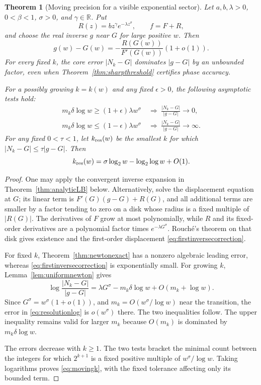 \documentclass[11pt,a4paper]{article}
\newtheorem{theorem}{Theorem}[section]
\theoremstyle{definition}
\theoremstyle{remark}
\newcommand{\R}{\mathbb R}
\numberwithin{equation}{section}
\begin{document}
\begin{theorem}[Moving precision for a visible exponential sector]\label{thm:resolution}
Let $a,b,\lambda>0$, $0<\beta<1$, $\sigma>0$, and $\gamma\in\R$. Put
\[
 R(z)=b z^\gamma e^{-\lambda z^\sigma},\qquad f=F+R,
\]
and choose the real inverse $g$ near $G$ for large positive $w$. Then
\begin{equation}\label{eq:firstinversecorrection}
 g(w)-G(w)=-\frac{R(G(w))}{F'(G(w))}(1+o(1)).
\end{equation}
For every fixed $k$, the core error $|N_k-G|$ dominates $|g-G|$ by an unbounded factor, even when Theorem~\ref{thm:sharpthreshold} certifies phase accuracy.

For a possibly growing $k=k(w)$ and any fixed $\epsilon>0$, the following asymptotic tests hold:
\begin{align}
 m_k\delta\log w\ge(1+\epsilon)\lambda w^\sigma
 &\ \Longrightarrow\ \frac{|N_k-G|}{|g-G|}\longrightarrow0,\label{eq:resolutionupper}\\
 m_k\delta\log w\le(1-\epsilon)\lambda w^\sigma
 &\ \Longrightarrow\ \frac{|N_k-G|}{|g-G|}\longrightarrow\infty.
 \label{eq:resolutionlower}
\end{align}
For any fixed $0<\tau<1$, let $k_{\rm res}(w)$ be the smallest $k$ for which $|N_k-G|\le\tau|g-G|$. Then
\begin{equation}\label{eq:movingk}
 k_{\rm res}(w)=\sigma\log_2w-\log_2\log w+O(1).
\end{equation}
\end{theorem}
\begin{proof}
One may apply the convergent inverse expansion in Theorem~\ref{thm:analyticLB} below. Alternatively, solve the displacement equation at $G$; its linear term is $F'(G)(g-G)+R(G)$, and all additional terms are smaller by a factor tending to zero on a disk whose radius is a fixed multiple of $|R(G)|$. The derivatives of $F$ grow at most polynomially, while $R$ and its fixed-order derivatives are a polynomial factor times $e^{-\lambda G^\sigma}$. Rouch\'e's theorem on that disk gives existence and the first-order displacement \eqref{eq:firstinversecorrection}.

For fixed $k$, Theorem~\ref{thm:newtonexact} has a nonzero algebraic leading error, whereas \eqref{eq:firstinversecorrection} is exponentially small. For growing $k$, Lemma~\ref{lem:uniformnewton} gives
\begin{equation}\label{eq:resolutionlog}
 \log\frac{|N_k-G|}{|g-G|}
 =\lambda G^\sigma-m_k\delta\log w+O(m_k+\log w).
\end{equation}
Since $G^\sigma=w^\sigma(1+o(1))$, and $m_k=O(w^\sigma/\log w)$ near the transition, the error in \eqref{eq:resolutionlog} is $o(w^\sigma)$ there. The two inequalities follow. The upper inequality remains valid for larger $m_k$ because $O(m_k)$ is dominated by $m_k\delta\log w$.

The errors decrease with $k\ge1$. The two tests bracket the minimal count between the integers for which $2^{k+1}$ is a fixed positive multiple of $w^\sigma/\log w$. Taking logarithms proves \eqref{eq:movingk}, with the fixed tolerance affecting only its bounded term.
\end{proof}
\end{document}
